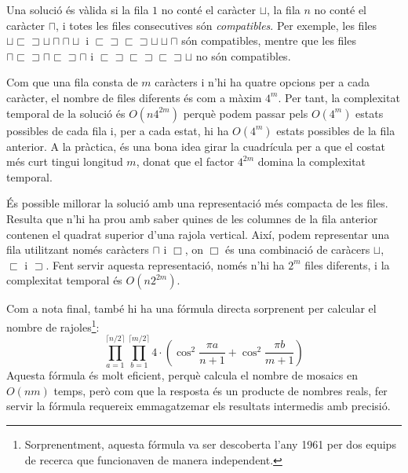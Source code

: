 Una solució és vàlida si la fila $1$ no conté
el caràcter $\sqcup$,
la fila $n$ no conté el caràcter $\sqcap$,
i totes les files consecutives són \emph{compatibles}.
Per exemple, les files
$\sqcup \sqsubset \sqsupset \sqcup \sqcap \sqcap \sqcup$ i
$\sqsubset \sqsupset \sqsubset \sqsupset \sqcup \sqcup \sqcap$
són compatibles, mentre que les files
$\sqcap \sqsubset \sqsupset \sqcap \sqsubset \sqsupset \sqcap$ i
$\sqsubset \sqsupset \sqsubset \sqsupset \sqsubset \sqsupset \sqcup$
no són compatibles.

Com que una fila consta de $m$ caràcters i n'hi ha
quatre opcions per a cada caràcter, el nombre de files diferents
és com a màxim $4^m$.
Per tant, la complexitat temporal de la solució és
$O(n 4^{2m})$ perquè podem passar pels
$O(4^m)$ estats possibles de cada fila
i, per a cada estat, hi ha $O(4^m)$
estats possibles de la fila anterior.
A la pràctica, és una bona idea girar la cuadrícula
per a que el costat més curt tingui longitud $m$,
donat que el factor $4^{2m}$ domina la complexitat temporal.

És possible millorar la solució amb una
representació més compacta de les files.
Resulta que n'hi ha prou amb saber quines
de les columnes de la fila anterior contenen el quadrat superior
d'una rajola vertical.
Així, podem representar una fila utilitzant només caràcters
$\sqcap$ i $\Box$, on $\Box$ és una combinació
de caràcers
$\sqcup$, $\sqsubset$ i $\sqsupset$.
Fent servir aquesta representació, només n'hi ha
$2^m$ files diferents, i la complexitat temporal és
$O(n 2^{2m})$.

Com a nota final, també hi ha una fórmula directa sorprenent
per calcular el nombre de rajoles\footnote{Sorprenentment,
aquesta fórmula va ser descoberta l'any 1961 per dos equips de recerca \cite{kas61,tem61}
que funcionaven de manera independent.}:
\[ \prod_{a=1}^{\lceil n/2 \rceil} \prod_{b=1}^{\lceil m/2 \rceil} 4 \cdot (\cos^2 \frac{\pi a }{n + 1} + \cos^2 \frac{\pi b}{m+1})\]
Aquesta fórmula és molt eficient, perquè calcula
el nombre de mosaics en $O(nm)$ temps,
però com que la resposta és un producte de nombres reals,
fer servir la fórmula requereix 
emmagatzemar els resultats intermedis amb precisió.
